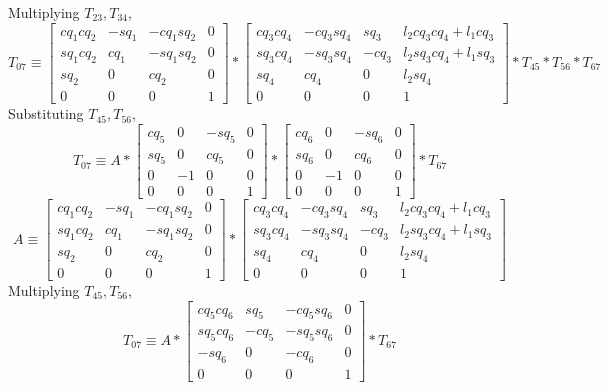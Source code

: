 \documentclass[12pt]{article}
\begin{document}
Multiplying $T_{23}, T_{34}$,
\[
  T_{07} \equiv
  \begin{bmatrix} cq_1cq_2 & -sq_1 & -cq_1sq_2 & 0 \\ sq_1cq_2 & cq_1 & -sq_1sq_2 & 0 \\ sq_2 & 0 & cq_2 & 0 \\ 0 & 0 & 0 & 1 \end{bmatrix}
  * \begin{bmatrix} cq_3cq_4 & -cq_3sq_4 & sq_3 & l_2cq_3cq_4 + l_1cq_3 \\ sq_3cq_4 & -sq_3sq_4 & -cq_3 & l_2sq_3cq_4 + l_1sq_3 \\ sq_4 & cq_4 & 0 & l_2sq_4 \\ 0 & 0 & 0 & 1 \end{bmatrix}
  * T_{45}
  * T_{56}
  * T_{67}
\]
Substituting $T_{45}, T_{56}$,
\[
  T_{07} \equiv
  A
  * \begin{bmatrix} cq_5 & 0 & -sq_5 & 0 \\ sq_5 & 0 & cq_5 & 0 \\ 0 & -1 & 0 & 0 \\ 0 & 0 & 0 & 1 \end{bmatrix}
  * \begin{bmatrix} cq_6 & 0 & -sq_6 & 0 \\ sq_6 & 0 & cq_6 & 0 \\ 0 & -1 & 0 & 0 \\ 0 & 0 & 0 & 1 \end{bmatrix}
  * T_{67}
\]
\[
  A \equiv
  \begin{bmatrix} cq_1cq_2 & -sq_1 & -cq_1sq_2 & 0 \\ sq_1cq_2 & cq_1 & -sq_1sq_2 & 0 \\ sq_2 & 0 & cq_2 & 0 \\ 0 & 0 & 0 & 1 \end{bmatrix}
  * \begin{bmatrix} cq_3cq_4 & -cq_3sq_4 & sq_3 & l_2cq_3cq_4 + l_1cq_3 \\ sq_3cq_4 & -sq_3sq_4 & -cq_3 & l_2sq_3cq_4 + l_1sq_3 \\ sq_4 & cq_4 & 0 & l_2sq_4 \\ 0 & 0 & 0 & 1 \end{bmatrix}
\]
Multiplying $T_{45}, T_{56}$,
\[
  T_{07} \equiv
  A
  * \begin{bmatrix} cq_5cq_6 & sq_5 & -cq_5sq_6 & 0 \\ sq_5cq_6 & -cq_5 & -sq_5sq_6 & 0 \\ -sq_6 & 0 & -cq_6 & 0 \\ 0 & 0 & 0 & 1 \end{bmatrix}
  * T_{67}
\]
\end{document}
